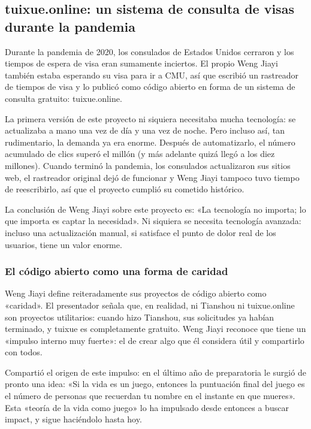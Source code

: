 \documentclass[a4paper]{article}
\begin{document}
\subsection{tuixue.online: un sistema de consulta de visas durante la pandemia}

Durante la pandemia de 2020, los consulados de Estados Unidos cerraron y los tiempos de espera de visa eran sumamente inciertos. El propio Weng Jiayi también estaba esperando su visa para ir a CMU, así que escribió un rastreador de tiempos de visa y lo publicó como código abierto en forma de un sistema de consulta gratuito: tuixue.online.

La primera versión de este proyecto ni siquiera necesitaba mucha tecnología: se actualizaba a mano una vez de día y una vez de noche. Pero incluso así, tan rudimentario, la demanda ya era enorme. Después de automatizarlo, el número acumulado de clics superó el millón (y más adelante quizá llegó a los diez millones). Cuando terminó la pandemia, los consulados actualizaron sus sitios web, el rastreador original dejó de funcionar y Weng Jiayi tampoco tuvo tiempo de reescribirlo, así que el proyecto cumplió su cometido histórico.

La conclusión de Weng Jiayi sobre este proyecto es: «La tecnología no importa; lo que importa es captar la necesidad». Ni siquiera se necesita tecnología avanzada: incluso una actualización manual, si satisface el punto de dolor real de los usuarios, tiene un valor enorme.

\subsubsection{El código abierto como una forma de caridad}

Weng Jiayi define reiteradamente sus proyectos de código abierto como «caridad». El presentador señala que, en realidad, ni Tianshou ni tuixue.online son proyectos utilitarios: cuando hizo Tianshou, sus solicitudes ya habían terminado, y tuixue es completamente gratuito. Weng Jiayi reconoce que tiene un «impulso interno muy fuerte»: el de crear algo que él considera útil y compartirlo con todos.

Compartió el origen de este impulso: en el último año de preparatoria le surgió de pronto una idea: «Si la vida es un juego, entonces la puntuación final del juego es el número de personas que recuerdan tu nombre en el instante en que mueres». Esta «teoría de la vida como juego» lo ha impulsado desde entonces a buscar impact, y sigue haciéndolo hasta hoy.
\end{document}
